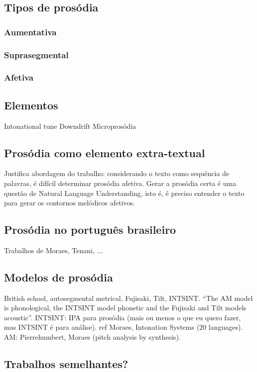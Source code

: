 \subsection{Tipos de prosódia}
\subsubsection{Aumentativa}
\subsubsection{Suprasegmental}
\subsubsection{Afetiva}
\subsection{Elementos}
Intonational tune
Downdrift
Microprosódia
\subsection{Prosódia como elemento extra-textual}
Justifica abordagem do trabalho: considerando o texto como sequência de
palavras, é difícil determinar prosódia afetiva. Gerar a prosódia certa é uma
questão de Natural Language Understanding, isto é, é preciso entender o texto
para gerar os contornos melódicos afetivos.
\subsection{Prosódia no português brasileiro}
Trabalhos de Moraes, Tenani, ...
\subsection{Modelos de prosódia}
British school, autosegmental metrical, Fujisaki, Tilt, INTSINT.
``The AM model is phonological, the INTSINT model phonetic and the Fujisaki and Tilt models acoustic''.
INTSINT: IPA para prosódia (mais ou menos o que eu quero fazer, mas INTSINT é
para análise).
ref Moraes, Intonation Systems (20 languages).
AM: Pierrehumbert, Moraes (pitch analysis by synthesis).
\subsection{Trabalhos semelhantes?}
